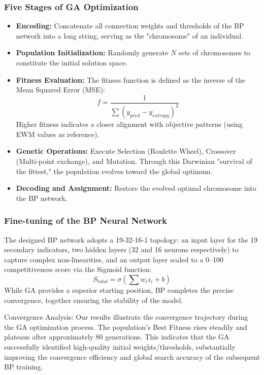 \documentclass[12pt]{article}
\begin{document}
	\subsubsection{Five Stages of GA Optimization}
	\begin{itemize}
		\item \textbf{Encoding:} Concatenate all connection weights and thresholds of the BP network into a long string, serving as the "chromosome" of an individual.
		\item \textbf{Population Initialization:} Randomly generate $N$ sets of chromosomes to constitute the initial solution space.
		\item \textbf{Fitness Evaluation:} The fitness function is defined as the inverse of the Mean Squared Error (MSE):
		$$f = \frac{1}{\sum (y_{pred} - y_{entropy})^2}$$
		Higher fitness indicates a closer alignment with objective patterns (using EWM values as reference).
		\item \textbf{Genetic Operations:} Execute Selection (Roulette Wheel), Crossover (Multi-point exchange), and Mutation. Through this Darwinian "survival of the fittest," the population evolves toward the global optimum.
		\item \textbf{Decoding and Assignment:} Restore the evolved optimal chromosome into the BP network.
	\end{itemize}
	
	\subsubsection{Fine-tuning of the BP Neural Network}
	The designed BP network adopts a 19-32-16-1 topology: an input layer for the 19 secondary indicators, two hidden layers (32 and 16 neurons respectively) to capture complex non-linearities, and an output layer scaled to a 0–100 competitiveness score via the Sigmoid function:
	$$S_{total} = \sigma \left( \sum w_i z_i + b \right)$$
	While GA provides a superior starting position, BP completes the precise convergence, together ensuring the stability of the model.
	
	Convergence Analysis: Our results illustrate the convergence trajectory during the GA optimization process. The population's Best Fitness rises steadily and plateaus after approximately 80 generations. This indicates that the GA successfully identified high-quality initial weights/thresholds, substantially improving the convergence efficiency and global search accuracy of the subsequent BP training.
	
\end{document}
